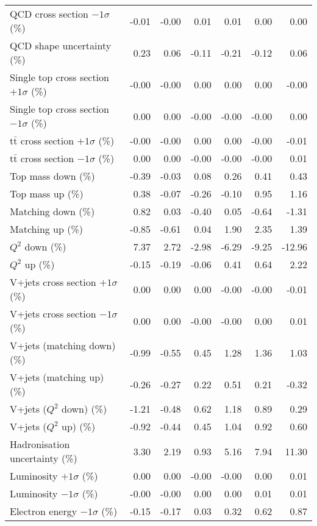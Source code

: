 \begin{table}[htbp]
{\begin{tabular}{lrrrrrr}
QCD cross section \ensuremath{-1\sigma} (\%) & -0.01 & -0.00 & 0.01 & 0.01 & 0.00 & 0.00 \\ 
QCD shape uncertainty (\%) & 0.23 & 0.06 & -0.11 & -0.21 & -0.12 & 0.06 \\ 
Single top cross section $+1\sigma$ (\%) & -0.00 & -0.00 & 0.00 & 0.00 & 0.00 & -0.00 \\ 
Single top cross section $-1\sigma$ (\%) & 0.00 & 0.00 & -0.00 & -0.00 & -0.00 & 0.00 \\ 
$\mathrm{t}\bar{\mathrm{t}}$ cross section $+1\sigma$ (\%) & -0.00 & -0.00 & 0.00 & 0.00 & -0.00 & -0.01 \\ 
$\mathrm{t}\bar{\mathrm{t}}$ cross section $-1\sigma$ (\%) & 0.00 & 0.00 & -0.00 & -0.00 & -0.00 & 0.01 \\ 
Top mass down (\%) & -0.39 & -0.03 & 0.08 & 0.26 & 0.41 & 0.43 \\ 
Top mass up (\%) & 0.38 & -0.07 & -0.26 & -0.10 & 0.95 & 1.16 \\ 
Matching down (\%) & 0.82 & 0.03 & -0.40 & 0.05 & -0.64 & -1.31 \\ 
Matching up (\%) & -0.85 & -0.61 & 0.04 & 1.90 & 2.35 & 1.39 \\ 
$Q^{2}$ down (\%) & 7.37 & 2.72 & -2.98 & -6.29 & -9.25 & -12.96 \\ 
$Q^{2}$ up (\%) & -0.15 & -0.19 & -0.06 & 0.41 & 0.64 & 2.22 \\ 
V+jets cross section \ensuremath{+1\sigma} (\%) & 0.00 & 0.00 & 0.00 & -0.00 & -0.00 & -0.01 \\ 
V+jets cross section \ensuremath{-1\sigma} (\%) & 0.00 & 0.00 & -0.00 & -0.00 & 0.00 & 0.01 \\ 
V+jets (matching down) (\%) & -0.99 & -0.55 & 0.45 & 1.28 & 1.36 & 1.03 \\ 
V+jets (matching up) (\%) & -0.26 & -0.27 & 0.22 & 0.51 & 0.21 & -0.32 \\ 
V+jets ($Q^{2}$ down) (\%) & -1.21 & -0.48 & 0.62 & 1.18 & 0.89 & 0.29 \\ 
V+jets ($Q^{2}$ up) (\%) & -0.92 & -0.44 & 0.45 & 1.04 & 0.92 & 0.60 \\ 
Hadronisation uncertainty (\%) & 3.30 & 2.19 & 0.93 & 5.16 & 7.94 & 11.30 \\ 
Luminosity $+1\sigma$ (\%) & 0.00 & 0.00 & -0.00 & -0.00 & 0.00 & 0.01 \\ 
Luminosity $-1\sigma$ (\%) & -0.00 & -0.00 & 0.00 & 0.00 & 0.01 & 0.01 \\ 
Electron energy $-1\sigma$ (\%) & -0.15 & -0.17 & 0.03 & 0.32 & 0.62 & 0.87 \\ 

\end{tabular}}
\end{table}
